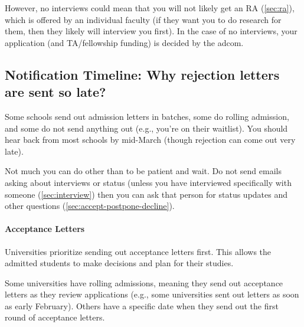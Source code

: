 \documentclass[oneside,11pt,dvipsnames]{book}
\def\subsectioninfo#1{%
    \addcontentsline{toc}{subsectioninfo}{%
    \noexpand\numberline{}\color{black}{#1}}%
}
\begin{document}
However, no interviews could mean that you will not likely get an RA (\autoref{sec:ra}), which is offered by an individual faculty (if they want you to do research for them, then they likely will interview you first).  In the case of no interviews, your application (and TA/fellowship funding) is decided by the adcom.



\subsection{Notification Timeline: Why rejection letters are sent so late?}\label{sec:late-rejection}
\subsectioninfo{Grad programs often wait for the accepted students to make their decisions, typically by April 15, before sending out rejection letters.}


Some schools send out admission letters in batches, some do rolling admission, and some do not send anything out (e.g., you're on their waitlist). You should hear back from most schools by mid-March (though rejection can come out very late).

Not much you can do other than to be patient and wait. Do not send emails asking about interviews or status (unless you have interviewed specifically with someone (\autoref{sec:interview}) then you can ask that person for status updates and other questions (\autoref{sec:accept-postpone-decline}).



\paragraph{Acceptance Letters} Universities prioritize sending out acceptance letters first. This allows the admitted students to make decisions and plan for their studies.

Some universities have rolling admissions, meaning they send out acceptance letters as they review applications (e.g., some universities sent out letters as soon as early February). Others have a specific date when they send out the first round of acceptance letters.   
\end{document}
